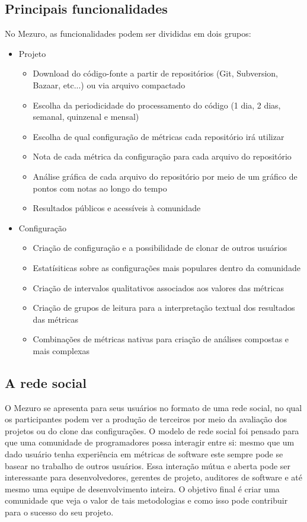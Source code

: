 \documentclass[12pt]{article}
\begin{document}
  \subsection{Principais funcionalidades}\label{sec:princ-funcionalidades}
  No Mezuro, as funcionalidades podem ser divididas em dois grupos:
  \begin{itemize}
    \item Projeto
      \begin{itemize}
      \item Download do código-fonte a partir de repositórios (Git, Subversion, Bazaar, etc...) ou via arquivo compactado
          \item Escolha da periodicidade do processamento do código (1 dia, 2 dias, semanal, quinzenal e mensal)
          \item Escolha de qual configuração de métricas cada repositório irá utilizar
          \item Nota de cada métrica da configuração para cada arquivo do repositório
          \item Análise gráfica de cada arquivo do repositório por meio de um gráfico de pontos com notas ao longo do tempo
          \item Resultados públicos e acessíveis à comunidade
      \end{itemize}
      \item Configuração
      \begin{itemize}
      \item Criação de configuração e a possibilidade de clonar de outros usuários
          \item Estatísiticas sobre as configurações mais populares dentro da comunidade
          \item Criação de intervalos qualitativos associados aos valores das métricas
          \item Criação de grupos de leitura para a interpretação textual dos resultados das métricas
          \item Combinações de métricas nativas para criação de análises compostas e mais complexas
      \end{itemize}
  \end{itemize}
 
  \subsection{A rede social}\label{sec:user-potencial}
  O Mezuro se apresenta para seus usuários no formato de uma rede social, no qual os participantes podem ver a produção de terceiros por meio da avaliação dos projetos ou do clone das configurações. O modelo de rede social foi pensado para que uma comunidade de programadores possa interagir entre si: mesmo que um dado usuário tenha experiência em métricas de software este sempre pode se basear no trabalho de outros usuários. Essa interação mútua e aberta pode ser interessante para desenvolvedores, gerentes de projeto, auditores de software e até mesmo uma equipe de desenvolvimento inteira. O objetivo final é criar uma comunidade que veja o valor de tais metodologias e como isso pode contribuir para o sucesso do seu projeto.
 
\end{document}
